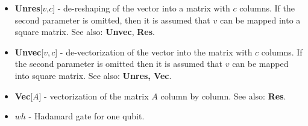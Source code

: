 \documentclass[a4paper,10pt]{scrartcl}
\begin{document}
\begin{itemize}
\item  \textbf{Unres}[$v$,$c$] - de-reshaping of the vector into a matrix with $c$ columns. If the second parameter is omitted, then it is assumed that $v$ can be mapped into a square matrix. See also: \textbf{Unvec}, \textbf{Res}.
\item  \textbf{Unvec}[$v,c$] - de-vectorization of the vector into the matrix with $c$ columns. If the second parameter is omitted then it is assumed that $v$ can be mapped into square matrix. See also: \textbf{Unres, Vec}.
\item  \textbf{Vec}[$A$] - vectorization of the matrix $A$ column by column. See also: \textbf{Res}.
\item  $wh$ - Hadamard gate for one qubit.
\end{itemize} 
\end{document}
